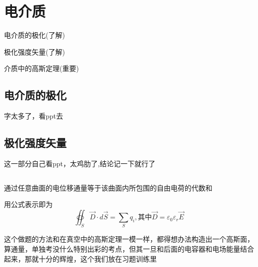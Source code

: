 \documentclass[lang=cn,10pt]{elegantbook}
\begin{document}
		\section{电介质}
		\begin{introduction}
			\item 电介质的极化(了解)
			\item 极化强度矢量(了解)
			\item 介质中的高斯定理(重要)
		\end{introduction}
		\subsection{电介质的极化}
		字太多了，看ppt去
		\subsection{极化强度矢量}
		这一部分自己看ppt，太鸡肋了,结论记一下就行了		
		\subsection{\color{red}}       
		\begin{theorem}[介质中的高斯定理]
			通过任意曲面的电位移通量等于该曲面内所包围的自由电荷的代数和
			
			用公式表示即为
			\begin{equation*}
				\oiint_S{\overrightarrow{D}\cdot d\overrightarrow{S}}=\sum_S{q_i},\text{其中}\overrightarrow{D}=\varepsilon _0\varepsilon _r\overrightarrow{E}
			\end{equation*}
		\end{theorem}              这个做题的方法和在真空中的高斯定理一模一样，都得想办法构造出一个高斯面，算通量，单独考没什么特别出彩的考点，但其一旦和后面的电容器和电场能量结合起来，那就十分的辉煌，这个我们放在习题训练里
		
\end{document}
